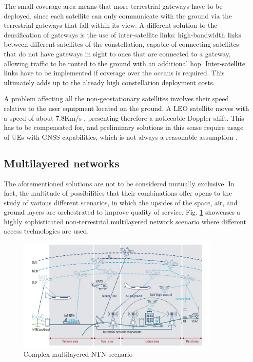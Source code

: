 The small coverage area means that more terrestrial gateways have to be deployed, since each satellite can only communicate with the ground via the terrestrial gateways that fall within its view. A different solution to the densification of gateways is the use of inter-satellite links: high-bandwidth links between different satellites of the constellation, capable of connecting satellites that do not have gateways in sight to ones that are connected to a gateway, allowing traffic to be routed to the ground with an additional hop. Inter-satellite links have to be implemented if coverage over the oceans is required. This ultimately adds up to the already high constellation deployment costs.

A problem affecting all the non-geostationary satellites involves their speed relative to the user equipment located on the ground. A \ac{LEO} satellite moves with a speed of about 7.8Km/s \cite{leo-definition-theory-facts}, presenting therefore a noticeable Doppler shift. This has to be compensated for, and preliminary solutions in this sense require usage of \ac{UE}s with GNSS capabilities, which is not always a reasonable assumption \cite{satellite-communication-mmwave-giordani, 3gpp-tr-38.821}.

\subsection{Multilayered networks}
The aforementioned solutions are not to be considered mutually exclusive. In fact, the multitude of possibilities that their combinations offer opens to the study of various different scenarios, in which the upsides of the space, air, and ground layers are orchestrated to improve quality of service. Fig. \ref{fig:multilayered-ntn} showcases a highly sophisticated non-terrestrial multilayered network scenario where different access technologies are used.

\begin{figure}[ht]
    \centering
    \includegraphics[width=0.9\textwidth]{res/multilayered-ntn.jpg}
    \caption{Complex multilayered \ac{NTN} scenario \cite{connecting-ntn-rohde-schwarz}}
    \label{fig:multilayered-ntn}
\end{figure}

